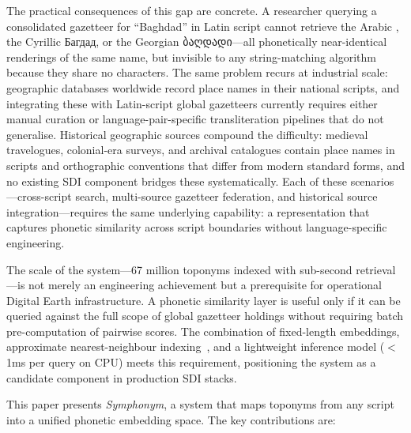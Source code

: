 \documentclass[11pt,a4paper]{article}
\newcommand{\textar}[1]{{\arabicfont\RL{#1}}}
\newcommand{\textgeorgian}[1]{{\georgianfont #1}}
\begin{document}
The practical consequences of this gap are concrete. A researcher querying a consolidated gazetteer for ``Baghdad'' in Latin script cannot retrieve the Arabic \textar{بغداد}, the Cyrillic Багдад, or the Georgian \textgeorgian{ბაღდადი}---all phonetically near-identical renderings of the same name, but invisible to any string-matching algorithm because they share no characters. The same problem recurs at industrial scale: geographic databases worldwide record place names in their national scripts, and integrating these with Latin-script global gazetteers currently requires either manual curation or language-pair-specific transliteration pipelines that do not generalise. Historical geographic sources compound the difficulty: medieval travelogues, colonial-era surveys, and archival catalogues contain place names in scripts and orthographic conventions that differ from modern standard forms, and no existing SDI component bridges these systematically. Each of these scenarios---cross-script search, multi-source gazetteer federation, and historical source integration---requires the same underlying capability: a representation that captures phonetic similarity across script boundaries without language-specific engineering.

The scale of the system---67 million toponyms indexed with sub-second retrieval---is not merely an engineering achievement but a prerequisite for operational Digital Earth infrastructure. A phonetic similarity layer is useful only if it can be queried against the full scope of global gazetteer holdings without requiring batch pre-computation of pairwise scores. The combination of fixed-length embeddings, approximate nearest-neighbour indexing~\citep{malkov2020hnsw}, and a lightweight inference model ($<$1ms per query on CPU) meets this requirement, positioning the system as a candidate component in production SDI stacks.

This paper presents \emph{Symphonym}, a system that maps toponyms from any script into a unified phonetic embedding space. The key contributions are:
\end{document}
